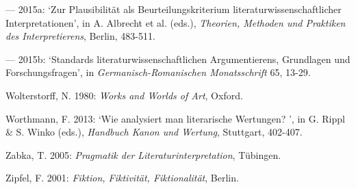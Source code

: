 \begin{hangparas}{.5cm}{1}
--- 2015a: `Zur Plausibilit\"at als Beurteilungskriterium literaturwissenschaftlicher Interpretationen', in A. Albrecht et al. (eds.), \emph{Theorien, Methoden und Praktiken des Interpretierens}, Berlin, 483-511.

--- 2015b: `Standards literaturwissenschaftlichen Argumentierens, Grundlagen und Forschungsfragen', in \emph{Germanisch-Romanischen Monatsschrift} 65, 13-29.

Wolterstorff, N. 1980: \emph{Works and Worlds of Art}, Oxford.

Worthmann, F. 2013: `Wie analysiert man literarische Wertungen? ', in G. Rippl \& S. Winko (eds.), \emph{Handbuch Kanon und Wertung}, Stuttgart, 402-407.

Zabka, T. 2005: \emph{Pragmatik der Literaturinterpretation}, T\"ubingen.

Zipfel, F. 2001: \emph{Fiktion, Fiktivit\"at, Fiktionalit\"at}, Berlin.

\end{hangparas}
